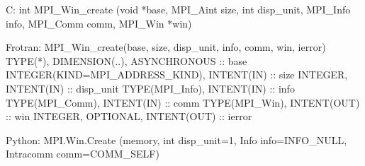 C:
int MPI_Win_create
   (void *base, MPI_Aint size, int disp_unit,
    MPI_Info info, MPI_Comm comm, MPI_Win *win)

Frotran:
MPI_Win_create(base, size, disp_unit, info, comm, win, ierror)
TYPE(*), DIMENSION(..), ASYNCHRONOUS :: base
INTEGER(KIND=MPI_ADDRESS_KIND), INTENT(IN) :: size
INTEGER, INTENT(IN) :: disp_unit
TYPE(MPI_Info), INTENT(IN) :: info
TYPE(MPI_Comm), INTENT(IN) :: comm
TYPE(MPI_Win), INTENT(OUT) :: win
INTEGER, OPTIONAL, INTENT(OUT) :: ierror

Python:
MPI.Win.Create
   (memory, int disp_unit=1,
    Info info=INFO_NULL, Intracomm comm=COMM_SELF)

